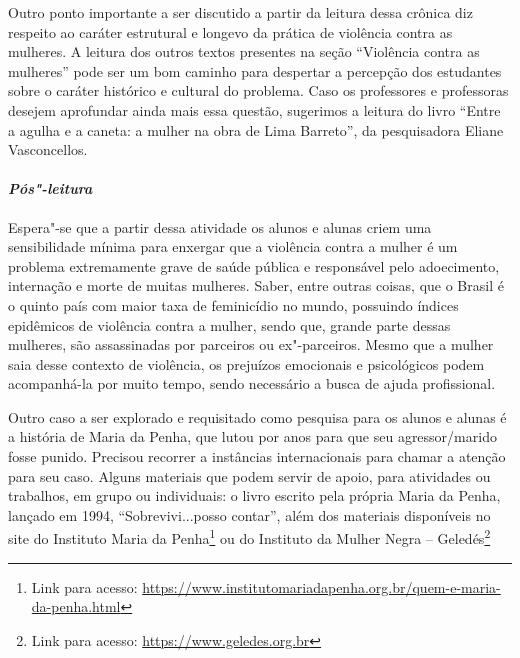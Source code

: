 \documentclass[11pt]{extarticle}
\begin{document}
Outro ponto importante a ser discutido a partir da leitura dessa crônica
diz respeito ao caráter estrutural e longevo da prática de violência
contra as mulheres. A leitura dos outros textos presentes na seção
``Violência contra as mulheres'' pode ser um bom caminho para despertar
a percepção dos estudantes sobre o caráter histórico e cultural do
problema. Caso os professores e professoras desejem aprofundar ainda
mais essa questão, sugerimos a leitura do livro ``Entre a agulha e a
caneta: a mulher na obra de Lima Barreto'', da pesquisadora Eliane
Vasconcellos.

\paragraph{\textit{Pós"-leitura}}

Espera"-se que a partir dessa atividade os alunos e alunas criem uma
sensibilidade mínima para enxergar que a violência contra a mulher é um
problema extremamente grave de saúde pública e responsável pelo
adoecimento, internação e morte de muitas mulheres. Saber, entre outras
coisas, que o Brasil é o quinto país com maior taxa de feminicídio no
mundo, possuindo índices epidêmicos de violência contra a mulher, sendo
que, grande parte dessas mulheres, são assassinadas por parceiros ou
ex"-parceiros. Mesmo que a mulher saia desse contexto de violência, os
prejuízos emocionais e psicológicos podem acompanhá-la por muito tempo,
sendo necessário a busca de ajuda profissional.

Outro caso a ser explorado e requisitado como pesquisa para os alunos e
alunas é a história de Maria da Penha, que lutou por anos para que seu
agressor/marido fosse punido. Precisou recorrer a instâncias
internacionais para chamar a atenção para seu caso. Alguns materiais que
podem servir de apoio, para atividades ou trabalhos, em grupo ou
individuais: o livro escrito pela própria Maria da Penha, lançado em
1994, ``Sobrevivi...posso contar'', além dos materiais disponíveis no
site do Instituto Maria da Penha\footnote{Link para acesso:
  \url{https://www.institutomariadapenha.org.br/quem-e-maria-da-penha.html}}
ou do Instituto da Mulher Negra -- Geledés\footnote{Link para acesso:
  \url{https://www.geledes.org.br}}




\end{document}
